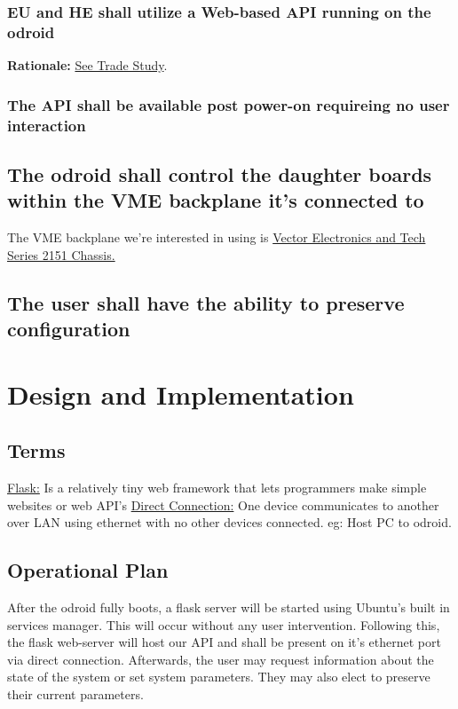 \documentclass[11pt,letterpaper]{article}
\begin{document}
\subsubsection{EU and HE shall utilize a Web-based API running on the odroid}
\textbf{Rationale:} \hyperref[sec:undefined_ui_req]{See Trade Study}.

\subsubsection{The API shall be available post power-on requireing no user interaction}

\subsection{The odroid shall control the daughter boards within the VME backplane it's connected to}
The VME backplane we're interested in using is \href{https://www.vectorelect.com/series-2151.html}{Vector Electronics and Tech Series 2151 Chassis.}
\subsection{The user shall have the ability to preserve configuration}
%
%
%
\newpage
\section{Design and Implementation}
\subsection{Terms}
\underline{Flask:} Is a relatively tiny web framework that lets programmers make simple websites or web API's
\underline{Direct Connection:} One device communicates to another over LAN using ethernet with no other devices connected. eg: Host PC to odroid.

\subsection{Operational Plan}
After the odroid fully boots, a flask server will be started using Ubuntu's built in services manager. This will occur without any user intervention.
Following this, the flask web-server will host our API and shall be present on it's ethernet port via direct connection. 
Afterwards, the user may request information about the state of the system or set system parameters. They may also elect to preserve their current parameters.
\end{document}
